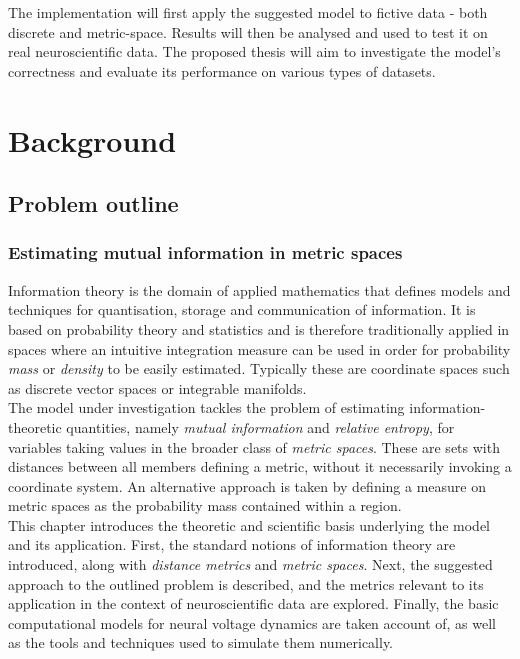\documentclass[12pt]{extarticle}
\begin{document}
\noindent
The implementation will first apply the suggested model to fictive
data - both discrete and metric-space. Results will then be analysed
and used to test it on real neuroscientific data. The proposed thesis
will aim to investigate the model's correctness and evaluate its
performance on various types of datasets.\\

\newpage
\section{Background}
\subsection{Problem outline} 

\subsubsection*{Estimating mutual information in metric spaces}

\noindent Information theory is the domain of applied mathematics that
defines models and techniques for quantisation, storage and
communication of information. It is based on probability theory and
statistics and is therefore traditionally applied in spaces where an
intuitive integration measure can be used in order for probability
\textit{mass} or \textit{density} to be easily estimated. Typically
these are coordinate spaces such as discrete vector spaces or
integrable manifolds.\\

\noindent The model under investigation tackles the problem of
estimating information-theoretic quantities, namely \textit{mutual
  information} and \textit{relative entropy}, for variables taking
values in the broader class of \textit{metric spaces}. These are sets
with distances between all members defining a metric, without it
necessarily invoking a coordinate system. An alternative approach is
taken by defining a measure on metric spaces as the probability mass
contained within a region.\\

\noindent This chapter introduces the theoretic and scientific basis
underlying the model and its application. First, the standard notions
of information theory are introduced, along with \textit{distance metrics} and \textit{metric
  spaces}. Next, the suggested approach to the outlined problem is
described, and the metrics relevant to its application in the context
of neuroscientific data are explored. Finally, the basic computational
models for neural voltage dynamics are taken account of, as well as
the tools and techniques used to simulate them numerically.\\
\end{document}
